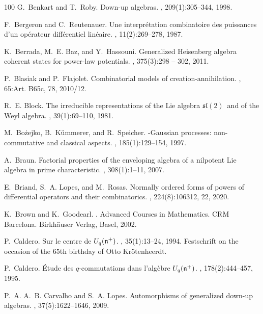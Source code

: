 \documentclass{commat}
\begin{document}
\begin{thebibliography}{100}
G.~Benkart and T.~Roby.
\newblock Down-up algebras.
, 209(1):305--344, 1998.

F.~Bergeron and C.~Reutenauer.
\newblock Une interpr\'{e}tation combinatoire des puissances d'un op\'{e}rateur
  diff\'{e}rentiel lin\'{e}aire.
, 11(2):269--278, 1987.

K.~Berrada, M.~E. Baz, and Y.~Hassouni.
\newblock Generalized {H}eisenberg algebra coherent states for power-law
  potentials.
, 375(3):298 -- 302, 2011.

P.~Blasiak and P.~Flajolet.
\newblock Combinatorial models of creation-annihilation.
, 65:Art. B65c, 78, 2010/12.

R.~E. Block.
\newblock The irreducible representations of the {L}ie algebra {${\mathfrak
  s}{\mathfrak l}(2)$}\ and of the {W}eyl algebra.
, 39(1):69--110, 1981.

M.~Bo\.{z}ejko, B.~K\"{u}mmerer, and R.~Speicher.
-{G}aussian processes: non-commutative and classical aspects.
, 185(1):129--154, 1997.

A.~Braun.
\newblock Factorial properties of the enveloping algebra of a nilpotent {L}ie
  algebra in prime characteristic.
, 308(1):1--11, 2007.

E.~Briand, S.~A. Lopes, and M.~Rosas.
\newblock Normally ordered forms of powers of differential operators and their
  combinatorics.
, 224(8):106312, 22, 2020.

K.~Brown and K.~Goodearl.
.
\newblock Advanced Courses in Mathematics. CRM Barcelona. Birkh\"auser Verlag,
  Basel, 2002.

P.~Caldero.
\newblock Sur le centre de {$U\sb q({\mathfrak n}\sp +)$}.
, 35(1):13--24, 1994.
\newblock Festschrift on the occasion of the 65th birthday of Otto
  Kr\"otenheerdt.

P.~Caldero.
\newblock \'{E}tude des {$q$}-commutations dans l'alg\`ebre {$U\sb q({\mathfrak
  n}\sp +)$}.
, 178(2):444--457, 1995.

P.~A. A.~B. Carvalho and S.~A. Lopes.
\newblock Automorphisms of generalized down-up algebras.
, 37(5):1622--1646, 2009.


\end{thebibliography}
\end{document}
